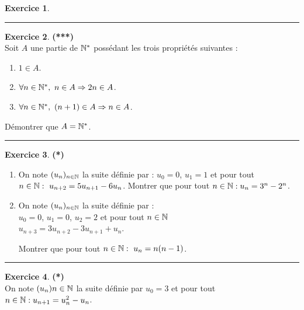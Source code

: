 \documentclass[a4paper,11pt]{article}
\theoremstyle{definition}
\newtheorem{exo}{Exercice} %
\begin{document}
\begin{minipage}{1\linewidth}
\begin{minipage}[t]{0.48\linewidth}
\begin{exo}
		\centering
\rule{1\linewidth}{0.6pt}
\end{exo}

		\begin{exo}\textbf{(***)}\quad\\[0.2cm]
	
	Soit $A$ une partie de $\mathbb{N}^*$ possédant les trois propriétés suivantes :
	\begin{enumerate}[$\bullet$]
		\item $1\in A$.
		\item $\forall n \in \mathbb{N}^*, \ n\in A \Large\Rightarrow 2n\in A$.
		\item $\forall n \in \mathbb{N}^*, \ (n+1)\in A \Large\Rightarrow n\in A$.
	\end{enumerate}
	
	Démontrer que $A=\mathbb{N}^*$.
	
	\centering
	\rule{1\linewidth}{0.6pt}
\end{exo}
	

	
		
		
		
	\end{minipage}	
	\hfill\vrule\hfill
	\begin{minipage}[t]{0.48\linewidth}
		\raggedright
		
				\begin{exo}\textbf{(*)}\quad\\[0.2cm]
			
			\begin{enumerate}	
				\item On note $(u_n )_{n\in\mathbb{N}}$ la suite définie par : $u_0 = 0$,
				$u_1 = 1$ et pour tout $n \in \mathbb{N} : \ u_{n+2} = 5u_{ n+1} - 6u_n$.
				Montrer que pour tout $n \in \mathbb{N} : u_n = 3^n - 2^n $.
				
				\item On note $(u_n )_{n\in\mathbb{N}}$ la suite définie par : \\
				$u_0 = 0$, $u_1 = 0$, $u_2 = 2$ et pour tout $n \in \mathbb{N} $ \\
				$u_{ n+3} = 3u_{ n+2} - 3u_{ n+1} + u_n $.
				
				Montrer que pour tout $n \in \mathbb{N} : \ u_n = n(n - 1)$.			
			\end{enumerate}
			
			\centering
			\rule{1\linewidth}{0.6pt}
		\end{exo}
	
			\begin{exo}\textbf{(*)}\quad\\[0.2cm]
		On note $(u_n){ n\in\mathbb{N} }$ la suite définie par $u_0 = 3$ et
		pour tout $n \in \mathbb{N} : u_{ n+1} = u^2_n -u_n $.
		

\end{exo}
\end{minipage}
\end{minipage}
\end{document}
